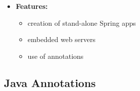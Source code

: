 \documentclass[ieeetran]{article}
\begin{document}
\begin{itemize}
\begin{itemize}
	\item \textbf{Features:}
		\begin{itemize}
		  \item creation of stand-alone Spring apps
		\item embedded web servers
		\item use of annotations
		\end{itemize}
	\end{itemize}
\end{itemize}

\subsection{Java Annotations} %
\label{sub:java_annotations}



































\end{document}
